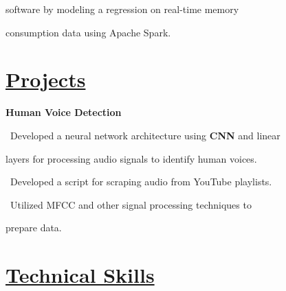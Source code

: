 \documentclass{article}
\begin{document}
\begin{minipage}[t][0pt]{8in\linewidth}
\begin{minipage}[t]{0.45\textwidth\hspace{0in}}
\begin{minipage}[t]{3.75in\textwidth\hspace{0in}}
            \hspace{1.6em} software by modeling a regression on real-time memory 
            
            \hspace{1.6em} consumption data using Apache Spark.
        \end{minipage}

        \vspace{-1.5em}
        \section{\underline{Projects}}
        \begin{minipage}[t]{3.75in\textwidth\hspace{0in}}

            \vspace{-1em}
            \mdseries\bfseries{Human Voice Detection}            
            
            \vspace{0em}
            \small\mdseries
            \hspace{1em}\textasteriskcentered \, \mdseries\textrm{Developed a neural network architecture using \textbf{CNN} and linear} 
            
            \hspace{2em}layers for processing audio signals to identify human voices.

            \vspace{0.6em}
            \hspace{1em}\textasteriskcentered \, \mdseries\textrm{Developed a script for scraping audio from YouTube playlists.}
            
            \vspace{0.6em}
            \hspace{1em}\textasteriskcentered \, \mdseries\textrm{Utilized MFCC and other signal processing techniques to} 
            
            \hspace{1.7em} prepare data.

        \end{minipage}

\end{minipage}
    \begin{minipage}[t]{3.1in\linewidth\hspace{2.8em}}
    \section{\underline{Technical Skills}}
    \vspace{-0.7em}

\end{minipage}
\end{minipage}
\end{document}
